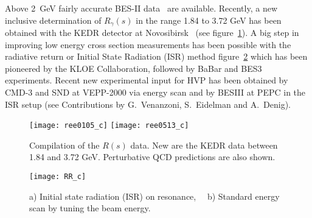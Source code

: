 \documentclass[epj,onecolumn]{webofc}
\begin{document}
Above 2~GeV fairly accurate BES-II data~\cite{BES02} are
available. Recently, a new inclusive determination of $R_\gamma(s)$ in
the range 1.84 to 3.72 GeV has been obtained with the KEDR detector at
Novosibirsk~\cite{Anashin:2015woa} (see figure~\ref{fig:Rofs}).
A big step in improving low energy cross section measurements has been
possible with the radiative return or Initial State Radiation (ISR)
method figure~\ref{fig:ISRvsScan} which has been pioneered by the KLOE Collaboration, followed by
BaBar and BES3 experiments.
Recent new experimental input for HVP has been obtained by CMD-3 and
SND at VEPP-2000 via energy scan and by BESIII at PEPC in the ISR
setup (see Contributions by G.~Venanzoni, S.~Eidelman and A.~Denig).
\begin{figure}
\centering
\texttt{[image: ree0105\_c]}
\texttt{[image: ree0513\_c]}
\caption{Compilation of the $R(s)$ data. New are the KEDR data between
1.84 and 3.72 GeV. Perturbative QCD predictions are also shown.}
\label{fig:Rofs}
\end{figure}
\begin{figure}
\vspace*{-0.7cm}
\centering
\texttt{[image: RR\_c]}
\caption{ a) Initial state radiation (ISR) on resonance,~~ b) Standard energy scan
by tuning the beam energy.}
\label{fig:ISRvsScan}
\end{figure}
\end{document}
